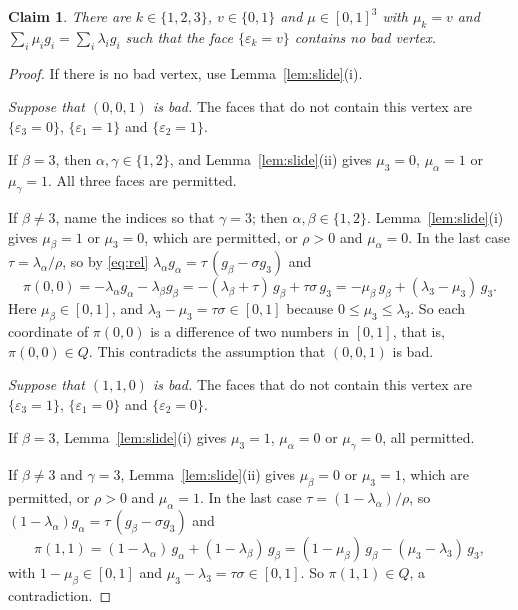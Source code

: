 \documentclass[11pt]{article}
\newtheorem{claim}[theorem]{Claim}
\theoremstyle{definition}
\newcommand{\eps}{\varepsilon}
\begin{document}
\begin{claim}\label{cl:face}
There are $k\in\{1,2,3\}$, $v\in\{0,1\}$ and $\mu\in[0,1]^3$ with
$\mu_k=v$ and $\sum_i\mu_ig_i=\sum_i\lambda_ig_i$ such that the face
$\{\eps_k=v\}$ contains no bad vertex.
\end{claim}
\begin{proof}
If there is no bad vertex, use Lemma~\ref{lem:slide}(i).

\emph{Suppose that $(0,0,1)$ is bad.}  The faces that do not contain this
vertex are $\{\eps_3=0\}$, $\{\eps_1=1\}$ and $\{\eps_2=1\}$.

If $\beta=3$, then $\alpha,\gamma\in\{1,2\}$, and
Lemma~\ref{lem:slide}(ii) gives $\mu_3=0$, $\mu_\alpha=1$ or
$\mu_\gamma=1$.  All three faces are permitted.

If $\beta\ne3$, name the indices so that $\gamma=3$; then
$\alpha,\beta\in\{1,2\}$.  Lemma~\ref{lem:slide}(i) gives $\mu_\beta=1$ or
$\mu_3=0$, which are permitted, or $\rho>0$ and $\mu_\alpha=0$.  In the
last case $\tau=\lambda_\alpha/\rho$, so by \eqref{eq:rel}
$\lambda_\alpha g_\alpha=\tau\,(g_\beta-\sigma g_3)$ and
\[
 \pi(0,0)=-\lambda_\alpha g_\alpha-\lambda_\beta g_\beta
 =-(\lambda_\beta+\tau)\,g_\beta+\tau\sigma\,g_3
 =-\mu_\beta\,g_\beta+(\lambda_3-\mu_3)\,g_3 .
\]
Here $\mu_\beta\in[0,1]$, and $\lambda_3-\mu_3=\tau\sigma\in[0,1]$ because
$0\le\mu_3\le\lambda_3$.  So each coordinate of $\pi(0,0)$ is a difference
of two numbers in $[0,1]$, that is, $\pi(0,0)\in Q$.  This contradicts the
assumption that $(0,0,1)$ is bad.

\emph{Suppose that $(1,1,0)$ is bad.}  The faces that do not contain this
vertex are $\{\eps_3=1\}$, $\{\eps_1=0\}$ and $\{\eps_2=0\}$.

If $\beta=3$, Lemma~\ref{lem:slide}(i) gives $\mu_3=1$, $\mu_\alpha=0$ or
$\mu_\gamma=0$, all permitted.

If $\beta\ne3$ and $\gamma=3$, Lemma~\ref{lem:slide}(ii) gives
$\mu_\beta=0$ or $\mu_3=1$, which are permitted, or $\rho>0$ and
$\mu_\alpha=1$.  In the last case $\tau=(1-\lambda_\alpha)/\rho$, so
$(1-\lambda_\alpha)g_\alpha=\tau\,(g_\beta-\sigma g_3)$ and
\[
 \pi(1,1)=(1-\lambda_\alpha)\,g_\alpha+(1-\lambda_\beta)\,g_\beta
 =(1-\mu_\beta)\,g_\beta-(\mu_3-\lambda_3)\,g_3 ,
\]
with $1-\mu_\beta\in[0,1]$ and $\mu_3-\lambda_3=\tau\sigma\in[0,1]$.  So
$\pi(1,1)\in Q$, a contradiction.
\end{proof}
\end{document}
